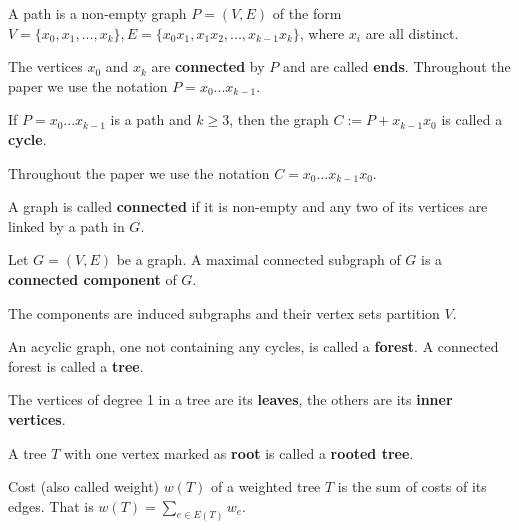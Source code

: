 \begin{definition}
    A path is a non-empty graph $P = (V,E)$ of the form $V = \{x_0, x_1, ..., x_k\}, E = \{x_0x_1, x_1x_2, ...,x_{k-1}x_k\}$, where $x_i$ are all distinct.   
\end{definition}
The vertices $x_0$ and $x_k$ are \textbf{connected} by $P$ and are called \textbf{ends}.
Throughout the paper we use the notation $P = x_0...x_{k-1}$.

\begin{definition}
    If $P = x_0...x_{k-1}$ is a path and $k\geq 3$, then the graph $C := P + x_{k-1}x_0$ is called a \textbf{cycle}.
\end{definition}
Throughout the paper we use the notation $C = x_0...x_{k-1}x_0$.

\begin{definition}
    A graph is called \textbf{connected} if it is non-empty and any two of its vertices are linked by a path in $G$.
\end{definition}

\begin{definition}
Let $G = (V, E)$ be a graph. A maximal connected subgraph of $G$ is a \textbf{connected component} of $G$.    
\end{definition}
The components are induced subgraphs and their vertex sets partition $V$.

\begin{definition}
    An acyclic graph, one not containing any cycles, is called a \textbf{forest}. A connected forest is called a \textbf{tree}.
\end{definition}

\begin{definition}
    The vertices of degree 1 in a tree are its \textbf{leaves}, the others are its \textbf{inner vertices}.
\end{definition}

\begin{definition}
    A tree $T$ with one vertex marked as \textbf{root} is called a \textbf{rooted tree}.
\end{definition}

\begin{definition}
    Cost (also called weight) $w(T)$ of a weighted tree $T$ is the sum of costs of its edges. That is $w(T) = \sum\limits_{e\in E(T)}w_e$.
\end{definition}

